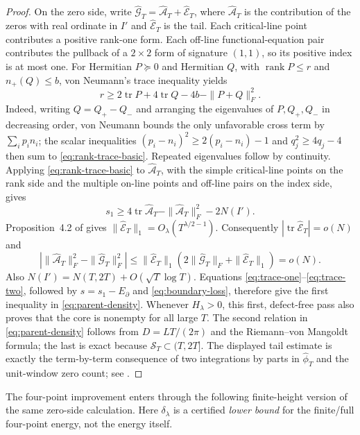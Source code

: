 \documentclass[11pt,reqno]{amsart}
\theoremstyle{definition}
\theoremstyle{remark}
\DeclareMathOperator{\tr}{tr}
\DeclareMathOperator{\rank}{rank}
\begin{document}
\begin{proof}
On the zero side, write
$\widehat{\mathcal G}_T=\widehat{\mathcal A}_T+\widehat{\mathcal E}_T$,
where $\widehat{\mathcal A}_T$ is the contribution of the zeros with real
ordinate in $I'$ and $\widehat{\mathcal E}_T$ is the tail.  Each
critical-line point contributes a positive rank-one
form.  Each off-line functional-equation pair contributes the pullback of a
$2\times2$ form of signature $(1,1)$, so its positive index is at most one.
For Hermitian $P\succeq0$ and Hermitian $Q$, with
$\rank P\le r$ and $n_+(Q)\le b$, von Neumann's trace inequality yields
\begin{equation}\label{eq:rank-trace-basic}
 r\ge2\tr P+4\tr Q-4b-\|P+Q\|_F^2.
\end{equation}
Indeed, writing $Q=Q_+-Q_-$ and arranging the eigenvalues of $P,Q_+,Q_-$
in decreasing order, von Neumann bounds the only unfavorable cross term by
$\sum_i p_i n_i$; the scalar inequalities
$(p_i-n_i)^2\ge2(p_i-n_i)-1$ and $q_j^2\ge4q_j-4$ then sum to
\eqref{eq:rank-trace-basic}.  Repeated eigenvalues follow by continuity.
Applying \eqref{eq:rank-trace-basic} to $\widehat{\mathcal A}_T$, with the
simple critical-line points on the rank side and the multiple on-line points
and off-line pairs on the index side, gives
\[
 s_1
 \ge4\tr\widehat{\mathcal A}_T-
 \|\widehat{\mathcal A}_T\|_F^2-2N(I').
\]
Proposition~4.2 of \cite{Claude2026} gives
$\|\widehat{\mathcal E}_T\|_1=O_\lambda(T^{\lambda/2-1})$.
Consequently $|\tr\widehat{\mathcal E}_T|=o(N)$ and
\[
 \left|\|\widehat{\mathcal A}_T\|_F^2-
 \|\widehat{\mathcal G}_T\|_F^2\right|
 \le \|\widehat{\mathcal E}_T\|_1
 \left(2\|\widehat{\mathcal G}_T\|_F+
 \|\widehat{\mathcal E}_T\|_1\right)=o(N).
\]
Also $N(I')=N(T,2T)+O(\sqrt T\log T)$.  Equations
\eqref{eq:trace-one}--\eqref{eq:trace-two}, followed by
$s=s_1-E_{\partial}$ and \eqref{eq:boundary-loss}, therefore give the first
inequality in \eqref{eq:parent-density}.  Whenever $H_\lambda>0$, this first,
defect-free pass also proves that the core is nonempty for all large $T$.
The second relation in \eqref{eq:parent-density} follows from
$D=LT/(2\pi)$ and the Riemann--von Mangoldt formula; the last is exact because
$\mathcal S_T\subset(T,2T]$.  The displayed tail estimate is exactly the
term-by-term consequence of two integrations by parts in $\widehat\phi_T$
and the unit-window zero count; see \cite[Proposition~4.2]{Claude2026}.
\end{proof}

The four-point improvement enters through the following finite-height
version of the same zero-side calculation.  Here $\delta_\lambda$ is a
certified \emph{lower bound} for the finite/full four-point energy, not the
energy itself.
\end{document}

